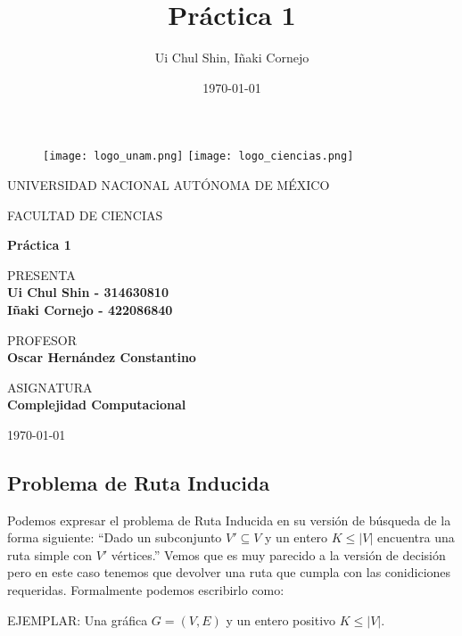 \documentclass[11pt]{article}
\title{Práctica 1}
\author{Ui Chul Shin, Iñaki Cornejo}
\date{\today}
\begin{document}
\thispagestyle{empty}
\begin{figure}[ht]
  \texttt{[image: logo\_unam.png]}
  \label{EscudoUNAM}
  \endminipage
  \texttt{[image: logo\_ciencias.png]}
  \label{EscudoFC}
  \endminipage
\end{figure}

\begin{center}
  \vspace{0.8cm}
  \LARGE
  UNIVERSIDAD NACIONAL AUTÓNOMA DE MÉXICO

  \vspace{0.8cm}
  \LARGE
  FACULTAD DE CIENCIAS

  \vspace{1.7cm}
  \Large
  \textbf{Práctica 1}

  \vspace{1.3cm}
  \normalsize
  PRESENTA \\
  \vspace{.3cm}
  \large
  \textbf{Ui Chul Shin - 314630810\\ Iñaki Cornejo - 422086840}

  \vspace{1.3cm}
  \normalsize
  PROFESOR \\
  \vspace{.3cm}
  \large
  \textbf{Oscar Hernández Constantino}

  \vspace{1.3cm}
  \normalsize
  ASIGNATURA \\
  \vspace{.3cm}
  \large
  \textbf{Complejidad Computacional}

  \vspace{1.3cm}
  \today
\end{center}

\newpage

\subsection*{Problema de Ruta Inducida}
Podemos expresar el problema de Ruta Inducida en su versión de búsqueda de la
forma siguiente: ``Dado un subconjunto $V' \subseteq V$ y un entero $K \leq |V|$
encuentra una ruta simple con $V'$ vértices.'' Vemos que es muy parecido a la
versión de decisión pero en este caso tenemos que devolver una ruta que cumpla
con las conidiciones requeridas. Formalmente podemos escribirlo como:

EJEMPLAR: Una gráfica $G = (V, E)$ y un entero positivo $K \leq |V|$.
\end{document}
